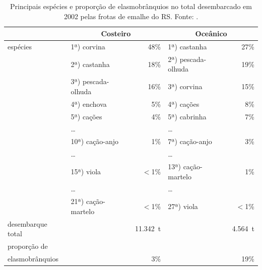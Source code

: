 \documentclass[a4paper,11pt,twoside,showtrims,onecolumn,openright,final]{memoir}
\begin{document}
\begin{table}
\caption[Principais espécies e proporção de elasmobrânquios no total desembarcado em 2002
         pelas frotas de emalhe do RS.]
	{Principais espécies e proporção de elasmobrânquios no total desembarcado em 2002
         pelas frotas de emalhe do RS. Fonte: \citet{ceperg2003}.}
\label{tab:capturas-emalhe-rs}
\begin{center}
\begin{tabular*}{\textwidth}{l@{\extracolsep{\fill}}lrlr}
\toprule
		& \multicolumn{2}{c}{Costeiro} & \multicolumn{2}{c}{Oceânico} \\
\midrule
espécies 	& 1ª) corvina		& 48\%	& 1ª) castanha		  & 27\%	\\
		& 2ª) castanha		& 18\%	& 2ª) pescada-olhuda	  & 19\%	\\
		& 3ª) pescada-olhuda	& 16\%	& 3ª) corvina 		  & 15\%	\\
		& 4ª) enchova		& 5\%	& 4ª) cações 		  & 8\%		\\
		& 5ª) cações		& 4\%	& 5ª) cabrinha 		  & 7\%		\\
		& \ldots 		&	& \ldots 		  &		\\
		& 10ª) cação-anjo	& 1\%	& 7ª) cação-anjo  	  & 3\%		\\
		& \ldots 		&	& \ldots 		  &		\\
		& 15ª) viola		& $<$1\%& 13ª) cação-martelo  	  & 1\%		\\
		& \ldots 		&	& \ldots 		  &		\\
		& 21ª) cação-martelo	& $<$1\%& 27ª) viola	  	  & $<$1\%	\\
\midrule
desembarque total & 			& 11.342~t& 			  & 4.564~t	\\
\midrule
proporção de	& 			&	& 			  & 		\\
elasmobrânquios	& 			& 3\%	& 			  & 19\%	\\
\bottomrule
\end{tabular*}
\end{center}
\end{table}


\end{document}
